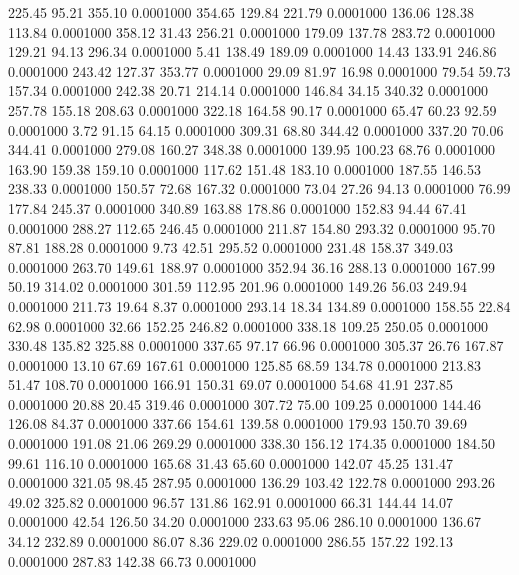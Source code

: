  225.45   95.21  355.10   0.0001000
 354.65  129.84  221.79   0.0001000
 136.06  128.38  113.84   0.0001000
 358.12   31.43  256.21   0.0001000
 179.09  137.78  283.72   0.0001000
 129.21   94.13  296.34   0.0001000
   5.41  138.49  189.09   0.0001000
  14.43  133.91  246.86   0.0001000
 243.42  127.37  353.77   0.0001000
  29.09   81.97   16.98   0.0001000
  79.54   59.73  157.34   0.0001000
 242.38   20.71  214.14   0.0001000
 146.84   34.15  340.32   0.0001000
 257.78  155.18  208.63   0.0001000
 322.18  164.58   90.17   0.0001000
  65.47   60.23   92.59   0.0001000
   3.72   91.15   64.15   0.0001000
 309.31   68.80  344.42   0.0001000
 337.20   70.06  344.41   0.0001000
 279.08  160.27  348.38   0.0001000
 139.95  100.23   68.76   0.0001000
 163.90  159.38  159.10   0.0001000
 117.62  151.48  183.10   0.0001000
 187.55  146.53  238.33   0.0001000
 150.57   72.68  167.32   0.0001000
  73.04   27.26   94.13   0.0001000
  76.99  177.84  245.37   0.0001000
 340.89  163.88  178.86   0.0001000
 152.83   94.44   67.41   0.0001000
 288.27  112.65  246.45   0.0001000
 211.87  154.80  293.32   0.0001000
  95.70   87.81  188.28   0.0001000
   9.73   42.51  295.52   0.0001000
 231.48  158.37  349.03   0.0001000
 263.70  149.61  188.97   0.0001000
 352.94   36.16  288.13   0.0001000
 167.99   50.19  314.02   0.0001000
 301.59  112.95  201.96   0.0001000
 149.26   56.03  249.94   0.0001000
 211.73   19.64    8.37   0.0001000
 293.14   18.34  134.89   0.0001000
 158.55   22.84   62.98   0.0001000
  32.66  152.25  246.82   0.0001000
 338.18  109.25  250.05   0.0001000
 330.48  135.82  325.88   0.0001000
 337.65   97.17   66.96   0.0001000
 305.37   26.76  167.87   0.0001000
  13.10   67.69  167.61   0.0001000
 125.85   68.59  134.78   0.0001000
 213.83   51.47  108.70   0.0001000
 166.91  150.31   69.07   0.0001000
  54.68   41.91  237.85   0.0001000
  20.88   20.45  319.46   0.0001000
 307.72   75.00  109.25   0.0001000
 144.46  126.08   84.37   0.0001000
 337.66  154.61  139.58   0.0001000
 179.93  150.70   39.69   0.0001000
 191.08   21.06  269.29   0.0001000
 338.30  156.12  174.35   0.0001000
 184.50   99.61  116.10   0.0001000
 165.68   31.43   65.60   0.0001000
 142.07   45.25  131.47   0.0001000
 321.05   98.45  287.95   0.0001000
 136.29  103.42  122.78   0.0001000
 293.26   49.02  325.82   0.0001000
  96.57  131.86  162.91   0.0001000
  66.31  144.44   14.07   0.0001000
  42.54  126.50   34.20   0.0001000
 233.63   95.06  286.10   0.0001000
 136.67   34.12  232.89   0.0001000
  86.07    8.36  229.02   0.0001000
 286.55  157.22  192.13   0.0001000
 287.83  142.38   66.73   0.0001000
